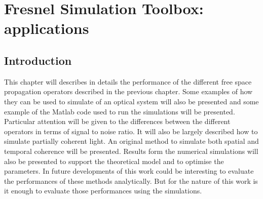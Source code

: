 \chapter{Fresnel Simulation Toolbox: applications}
\label{chap:fresnel2}
\section{Introduction}
This chapter will describes in details the performance of the different free space propagation operators described in the previous chapter. Some examples of how they can be used to simulate of an optical system will also be presented and some example of the Matlab code used to run the simulations will be presented. Particular attention will be given to the differences between the different operators in terms of signal to noise ratio.
It will also be largely described how to simulate partially coherent light. An original method to simulate both spatial and temporal coherence will be presented. Results form the numerical simulations will also be presented to support the theoretical model and to optimise the parameters.
In future developments of this work could be interesting to evaluate the performances of these methods analytically. But for the nature of this work is it enough to evaluate those performances using the simulations.
